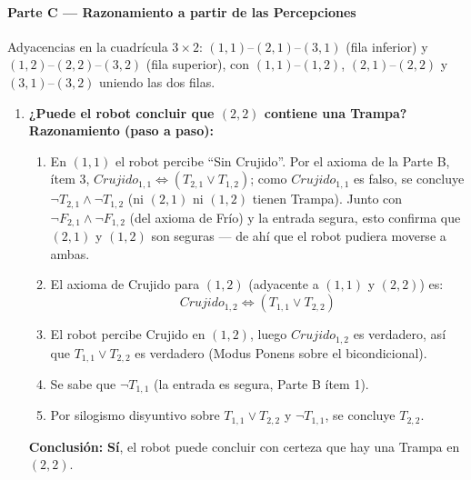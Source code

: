 \paragraph{Parte C --- Razonamiento a partir de las Percepciones}

Adyacencias en la cuadrícula $3\times2$: $(1,1)$--$(2,1)$--$(3,1)$ (fila inferior) y $(1,2)$--$(2,2)$--$(3,2)$
(fila superior), con $(1,1)$--$(1,2)$, $(2,1)$--$(2,2)$ y $(3,1)$--$(3,2)$ uniendo las dos filas.

\begin{enumerate}
    \item \textbf{¿Puede el robot concluir que $(2,2)$ contiene una Trampa?}\\
    \textbf{Razonamiento (paso a paso):}
    \begin{enumerate}
        \item En $(1,1)$ el robot percibe ``Sin Crujido''. Por el axioma de la Parte B, ítem 3,
        $Crujido_{1,1} \Leftrightarrow (T_{2,1}\lor T_{1,2})$; como $Crujido_{1,1}$ es falso, se
        concluye $\neg T_{2,1} \land \neg T_{1,2}$ (ni $(2,1)$ ni $(1,2)$ tienen Trampa). Junto con
        $\neg F_{2,1}\land\neg F_{1,2}$ (del axioma de Frío) y la entrada segura, esto confirma que
        $(2,1)$ y $(1,2)$ son seguras — de ahí que el robot pudiera moverse a ambas.
        \item El axioma de Crujido para $(1,2)$ (adyacente a $(1,1)$ y $(2,2)$) es:
        \[
            Crujido_{1,2} \Leftrightarrow (T_{1,1} \lor T_{2,2})
        \]
        \item El robot percibe Crujido en $(1,2)$, luego $Crujido_{1,2}$ es verdadero, así que
        $T_{1,1} \lor T_{2,2}$ es verdadero (Modus Ponens sobre el bicondicional).
        \item Se sabe que $\neg T_{1,1}$ (la entrada es segura, Parte B ítem 1).
        \item Por silogismo disyuntivo sobre $T_{1,1} \lor T_{2,2}$ y $\neg T_{1,1}$, se concluye
        $T_{2,2}$.
    \end{enumerate}
    \textbf{Conclusión:} \textbf{Sí}, el robot puede concluir con certeza que hay una Trampa en
    $(2,2)$.


\end{enumerate}
